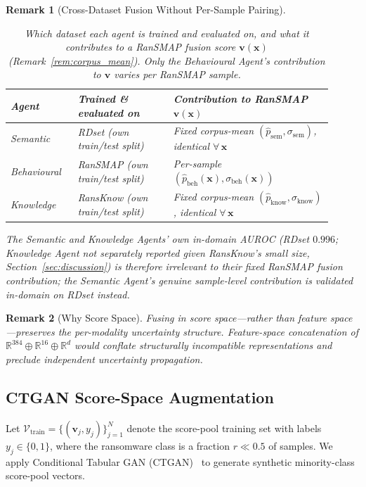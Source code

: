 \documentclass[journal]{IEEEtran}
\newcommand{\R}{\mathbb{R}}
\newtheorem{remark}{Remark}
\begin{document}
\begin{remark}[Cross-Dataset Fusion Without Per-Sample Pairing]
\begin{table}[t]
\centering
\footnotesize
\caption{Which dataset each agent is trained and evaluated on, and what it
  contributes to a RanSMAP fusion score $\mathbf{v}(\mathbf{x})$
  (Remark~\ref{rem:corpus_mean}). Only the Behavioural Agent's contribution
  to $\mathbf{v}$ varies per RanSMAP sample.}
\label{tab:agent_dataset_map}
\setlength{\tabcolsep}{3pt}
\begin{tabular}{@{}p{0.19\linewidth}p{0.27\linewidth}p{0.45\linewidth}@{}}
\toprule
Agent & Trained \& evaluated on & Contribution to RanSMAP $\mathbf{v}(\mathbf{x})$ \\
\midrule
Semantic &
  RDset (own train/test split) &
  Fixed corpus-mean $(\hat{p}_{\text{sem}},\sigma_{\text{sem}})$, identical $\forall\,\mathbf{x}$ \\[2pt]
Behavioural &
  RanSMAP (own train/test split) &
  Per-sample $(\hat{p}_{\text{beh}}(\mathbf{x}),\sigma_{\text{beh}}(\mathbf{x}))$ \\[2pt]
Knowledge &
  RansKnow (own train/test split) &
  Fixed corpus-mean $(\hat{p}_{\text{know}},\sigma_{\text{know}})$, identical $\forall\,\mathbf{x}$ \\
\bottomrule
\end{tabular}
\end{table}

The Semantic and Knowledge Agents' own in-domain AUROC (RDset $0.996$;
Knowledge Agent not separately reported given RansKnow's small size,
Section~\ref{sec:discussion}) is therefore irrelevant to their fixed
RanSMAP fusion contribution; the Semantic Agent's genuine sample-level
contribution is validated in-domain on RDset instead.
\end{remark}

\begin{remark}[Why Score Space]
Fusing in score space---rather than feature space---preserves the
per-modality uncertainty structure. Feature-space concatenation of
$\R^{384} \oplus \R^{16} \oplus \R^d$ would conflate structurally
incompatible representations and preclude independent uncertainty propagation.
\end{remark}

\subsection{CTGAN Score-Space Augmentation}

Let $\mathcal{V}_{\text{train}} = \{(\mathbf{v}_j, y_j)\}_{j=1}^{N}$ denote
the score-pool training set with labels $y_j \in \{0,1\}$, where the
ransomware class is a fraction $r \ll 0.5$ of samples. We apply Conditional
Tabular GAN (CTGAN)~\cite{xu_ctgan_2019} to generate synthetic minority-class
score-pool vectors.
\end{document}
